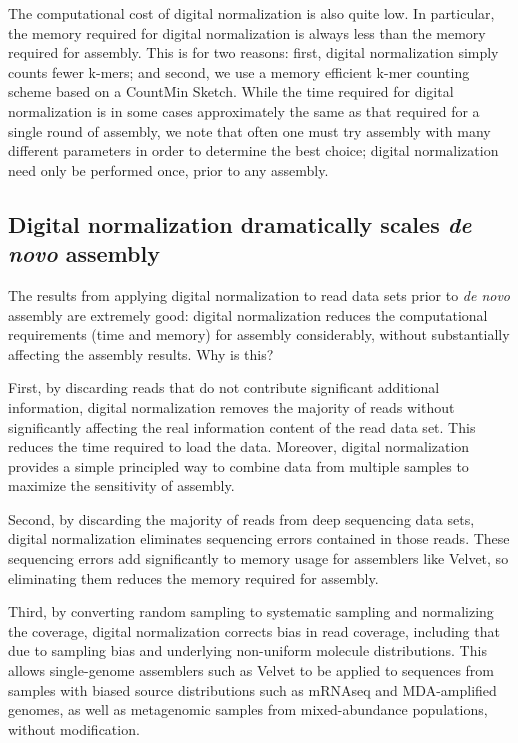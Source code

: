 \documentclass[10pt]{article}
\begin{document}
The computational cost of digital normalization is also quite low.  In
particular, the memory required for digital normalization is always
less than the memory required for assembly.  This is for two reasons:
first, digital normalization simply counts fewer k-mers; and second,
we use a memory efficient k-mer counting scheme based on a CountMin
Sketch.  While the time required for digital normalization is in some
cases approximately the same as that required for a single round of
assembly, we note that often one must try assembly with many different
parameters in order to determine the best choice; digital normalization
need only be performed once, prior to any assembly.

\subsection*{Digital normalization dramatically scales {\em de novo} assembly}

The results from applying digital normalization to read data sets
prior to {\em de novo} assembly are extremely good: digital normalization
reduces the computational requirements (time and memory) for assembly
considerably, without substantially affecting the assembly results.
Why is this?

First, by discarding reads that do not contribute significant
additional information, digital normalization removes the majority of
reads without significantly affecting the real information content of
the read data set.  This reduces the time required to load the data.
Moreover, digital normalization provides a simple principled way to
combine data from multiple samples to maximize the sensitivity of
assembly.

Second, by discarding the majority of reads from deep sequencing data
sets, digital normalization eliminates sequencing errors contained in
those reads.  These sequencing errors add significantly to memory
usage for assemblers like Velvet, so eliminating them reduces the
memory required for assembly.

Third, by converting random sampling to systematic sampling and
normalizing the coverage, digital normalization corrects bias in read
coverage, including that due to sampling bias and underlying
non-uniform molecule distributions.  This allows single-genome
assemblers such as Velvet to be applied to sequences from samples with
biased source distributions such as mRNAseq and MDA-amplified genomes,
as well as metagenomic samples from mixed-abundance populations,
without modification.
\end{document}
